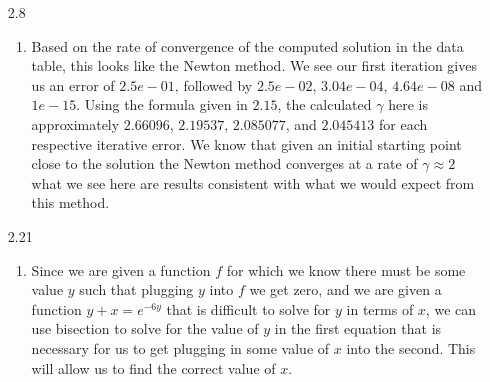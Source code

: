 \documentclass[11pt,a4paper]{article}
\begin{document}
\begin{itemize}
\begin{enumerate} [label={\alph*)}]
					\item Using Newton's method, we similarly solve in terms of $x$ in order to get our equation into a form in which we can differentiate it. Newton's method follows the form:
					$$x_{i+1} = x_i - \frac{f(x_i)}{f'(x_i)}$$
					Following this, we can substitute out equation into $f$ and its calculated derivative into $f'$ and calculate the next value of $x$. For example, using the function given in the problem, starting with $\alpha=36$ and $x=5$ we could iterate through and solve as follows:
					$$\begin{array}{c|c}
						x & error \\ \hline
						5 & 11 \\
						6.100000000000000e+00 & -1.209999999999994e+00 \\
						6.000819672131148e+00 & -9.836737436181409e-03 \\
						6.000000055980886e+00 &  -6.717706284575797e-07 \\
						6.000000000000001e+00 & -1.421085471520200e-14 \\
						6 & 0
					\end{array}$$
				\end{enumerate}
				See below for the MATLAB script used to generate this example:
				\begin{lstlisting}
function [output] = ch2q6(x0,alpha)
tol = 1e-16;
error = 1e10;
x = x0;
while abs(error) > tol
    f = x^2 - alpha;
    fp = 2*x;
    x = x - (f / fp);
    error = 0 - (x^2 - alpha)
end
output = x;
end
				\end{lstlisting}
			\item[2.8]
				\begin{enumerate} [label={\alph*)}]
					\item Based on the rate of convergence of the computed solution in the data table, this looks like the Newton method. We see our first iteration gives us an error of $2.5e-01$, followed by $2.5e-02$, $3.04e-04$, $4.64e-08$ and $1e-15$. Using the formula given in $2.15$, the calculated $\gamma$ here is approximately $2.66096$, $2.19537$, $2.085077$, and $2.045413$ for each respective iterative error. We know that given an initial starting point close to the solution the Newton method converges at a rate of $\gamma\approx2$ what we see here are results consistent with what we would expect from this method.
				\end{enumerate}
			\item[2.21]
				\begin{enumerate} [label={\alph*)}]
					\item Since we are given a function $f$ for which we know there must be some value $y$ such that plugging $y$ into $f$ we get zero, and we are given a function $y+x=e^{-6y}$ that is difficult to solve for $y$ in terms of $x$, we can use bisection to solve for the value of $y$ in the first equation that is necessary for us to get plugging in some value of $x$ into the second. This will allow us to find the correct value of $x$.
					

\end{enumerate}
\end{itemize}
\end{document}
